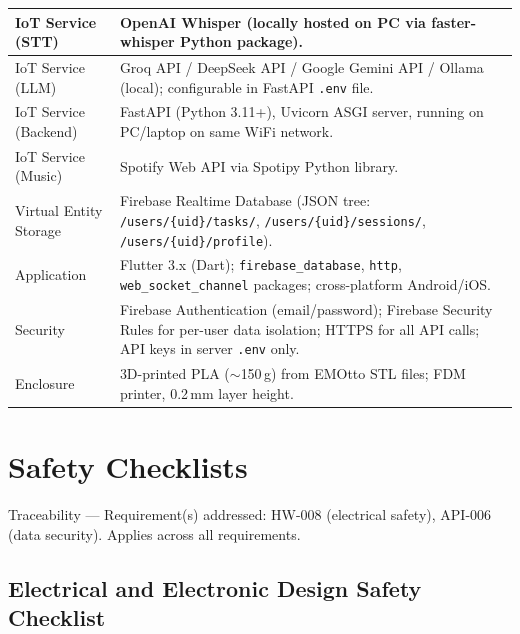 \documentclass[12pt,a4paper]{article}
\begin{document}
\begin{center}
\begin{tabular}{|L{0.18\textwidth}|L{0.70\textwidth}|}
IoT Service (STT) & OpenAI Whisper (locally hosted on PC via
                    faster-whisper Python package). \\ \hline
IoT Service (LLM) & Groq API / DeepSeek API / Google Gemini API /
                    Ollama (local); configurable in FastAPI
                    \texttt{.env} file. \\ \hline
IoT Service (Backend) & FastAPI (Python 3.11+), Uvicorn ASGI server,
                        running on PC/laptop on same WiFi network. \\ \hline
IoT Service (Music) & Spotify Web API via Spotipy Python library. \\ \hline
Virtual Entity Storage & Firebase Realtime Database (JSON tree:
                         \texttt{/users/\{uid\}/tasks/},
                         \texttt{/users/\{uid\}/sessions/},
                         \texttt{/users/\{uid\}/profile}). \\ \hline
Application & Flutter 3.x (Dart); \texttt{firebase\_database},
             \texttt{http}, \texttt{web\_socket\_channel} packages;
             cross-platform Android/iOS. \\ \hline
Security & Firebase Authentication (email/password); Firebase Security
           Rules for per-user data isolation; HTTPS for all API calls;
           API keys in server \texttt{.env} only. \\ \hline
Enclosure & 3D-printed PLA ($\sim$150\,g) from EMOtto STL files;
            FDM printer, 0.2\,mm layer height. \\ \hline
\end{tabular}
\end{center}

\newpage
\section{Safety Checklists}

\begin{tracebox}
Traceability --- Requirement(s) addressed: HW-008 (electrical safety),
API-006 (data security). Applies across all requirements.
\end{tracebox}

\vspace{0.3cm}

\subsection{Electrical and Electronic Design Safety Checklist}
\end{document}

